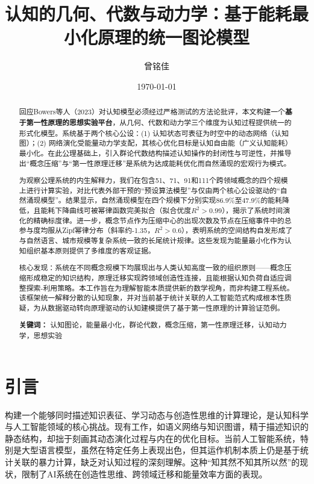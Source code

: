 \documentclass[12pt,a4paper]{article}
\title{认知的几何、代数与动力学：基于能耗最小化原理的统一图论模型}
\author{曾铭佳}
\date{\today}
\begin{document}
\maketitle

\begin{abstract}
回应Bowers等人（2023）对认知模型必须经过严格测试的方法论批评，本文构建一个\textbf{基于第一性原理的思想实验平台}，从几何、代数和动力学三个维度为认知过程提供统一的形式化模型。系统基于两个核心公设：(1) 认知状态可表征为时空中的动态网络（认知图）；(2) 网络演化受能量动力学支配，其核心优化目标是认知自由能（广义认知能耗）最小化。在此公理基础上，引入群论代数结构描述认知操作的封闭性与可逆性，并推导出“概念压缩”与“第一性原理迁移”是系统为达成能耗优化而自然涌现的宏观行为模式。

为观察公理系统的内生解释力，我们在包含51、71、91和111个跨领域概念的四个规模上进行计算实验，对比代表外部干预的“预设算法模型”与仅由两个核心公设驱动的“自然涌现模型”。结果显示，自然涌现模型在四个规模下分别实现86.9\%至47.9\%的能耗降低，且能耗下降曲线可被幂律函数完美拟合（拟合优度\(R^2>0.99\)），揭示了系统时间演化的精确标度律。进一步，概念节点作为压缩中心的出现次数及节点在压缩事件中的总参与度均服从Zipf幂律分布（斜率约-1.35，\(R^2>0.6\)），表明系统的空间结构自发形成了与自然语言、城市规模等复杂系统一致的长尾统计规律。这些发现为能量最小化作为认知组织基本原则提供了多维度的客观证据。

核心发现：系统在不同概念规模下均展现出与人类认知高度一致的组织原则——概念压缩形成稳定的知识结构，原理迁移实现跨领域创造性连接，且能根据认知负荷自适应调整探索-利用策略。本工作旨在为理解智能本质提供新的数学视角，而非构建工程系统。该框架统一解释分散的认知现象，并对当前基于统计关联的人工智能范式构成根本性质疑，为从数据驱动转向原理驱动的认知建模提供了基于第一性原理的计算验证范例。

\textbf{关键词：} 认知图论，能量最小化，群论代数，概念压缩，第一性原理迁移，认知动力学，思想实验
\end{abstract}

\newpage
\section{引言}

构建一个能够同时描述知识表征、学习动态与创造性思维的计算理论，是认知科学与人工智能领域的核心挑战。现有工作，如语义网络与知识图谱，精于描述知识的静态结构，却拙于刻画其动态演化过程与内在的优化目标。当前人工智能系统，特别是大型语言模型，虽然在特定任务上表现出色，但其运作机制本质上仍是基于统计关联的暴力计算，缺乏对认知过程的深刻理解。这种“知其然不知其所以然”的现状，限制了AI系统在创造性思维、跨领域迁移和能量效率方面的表现。
\end{document}
